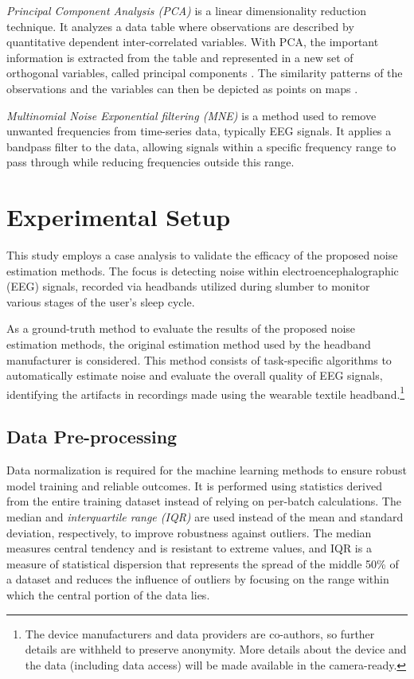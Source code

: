 \documentclass[runningheads]{llncs}
\begin{document}
\emph{Principal Component Analysis (PCA)} is a linear dimensionality
reduction technique. It analyzes a data table where observations are
described by quantitative dependent inter-correlated variables. With
PCA, the important information is extracted from the table and
represented in a new set of orthogonal variables, called principal
components \cite{bro2014principal}. The similarity patterns of the
observations and the variables can then be depicted as points on maps
\cite{abdi2010principal}.

\emph{Multinomial Noise Exponential filtering (MNE)} is a method used
to remove unwanted frequencies from time-series data, typically EEG
signals. It applies a bandpass filter to the data, allowing signals
within a specific frequency range to pass through while reducing
frequencies outside this range.



\section{Experimental Setup}
\label{sec:exp}

This study employs a case analysis to validate the efficacy of the
proposed noise estimation methods. The focus is detecting noise within
electroencephalographic (EEG) signals, recorded via headbands utilized
during slumber to monitor various stages of the user's sleep cycle.



As a ground-truth method to evaluate the results of the proposed noise
estimation methods, the original estimation method used by the
headband manufacturer is considered. This method consists of
task-specific algorithms to automatically estimate noise and evaluate
the overall quality of EEG signals, identifying the artifacts in
recordings made using the wearable textile headband.\footnote{The
  device manufacturers and data providers are co-authors, so further
  details are withheld to preserve anonymity. More details about the
  device and the data (including data access) will be made available in
  the camera-ready.}


\subsection{Data Pre-processing}

Data normalization is required for the machine learning methods to
ensure robust model training and reliable outcomes. It is performed
using statistics derived from the entire training dataset instead of
relying on per-batch calculations. The median and
\emph{interquartile range (IQR)} are used instead of the mean and
standard deviation, respectively, to improve robustness against
outliers. The median measures central tendency and is resistant to
extreme values, and IQR is a measure of statistical dispersion that
represents the spread of the middle 50\% of a dataset and reduces the
influence of outliers by focusing on the range within which the
central portion of the data lies.
\end{document}
